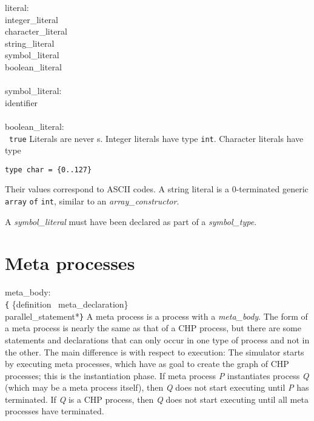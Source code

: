 \grammarstart
literal: \\
       \>integer\_literal \\
\orbox \>character\_literal \\
\orbox \>string\_literal \\
\orbox \>symbol\_literal \\
\orbox \>boolean\_literal \\
 \\
symbol\_literal: \\
      \>identifier \\
 \\
boolean\_literal: \\
       \orbox \ {\tt{}true}
\grammarend
Literals are never \lvalue s. Integer literals have type {\tt{}int}.
Character literals have type
\begin{verbatim}
type char = {0..127}
\end{verbatim}
Their values correspond to ASCII codes.
A string literal is a 0-terminated generic {\tt{}array} {\tt{}of} {\tt{}int},
similar to an {\it{}array\_constructor}.

A {\it{}symbol\_literal} must have been declared as part of a {\it{}symbol\_type}.


\section{Meta processes}\label{sec:meta}

\grammarstart
meta\_body: \\
       \verb|{| \{definition \orbox \ meta\_declaration\}\SERIESOPT \\
      \>\qquad  parallel\_statement*\TSEQOPT \verb|}|
\grammarend
A meta process is a process with a {\it{}meta\_body}. The form of a meta process
is nearly the same as that of a CHP process, but there are some
statements and declarations that can only occur in one type of process
and not in the other. The main difference is with respect to execution:
The simulator starts by executing meta processes, which have as goal to
create the graph of CHP processes; this is the instantiation phase.
If meta process {\it{}P} instantiates process {\it{}Q} (which may be a meta process
itself), then {\it{}Q} does not start executing until {\it{}P} has terminated.
If {\it{}Q} is a CHP process, then {\it{}Q} does not start executing until
all meta processes have terminated.

